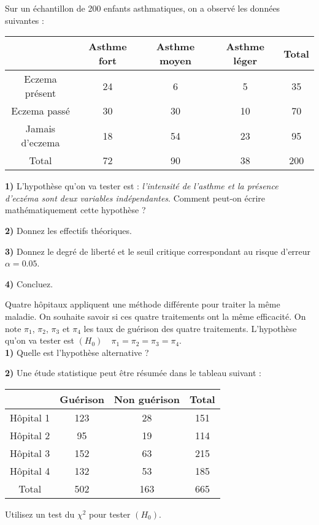 \documentclass{article}
\numberwithin{equation}{section}
\begin{document}
Sur un échantillon de 200 enfants asthmatiques, on a observé les données suivantes :\\
\begin{center}
\begin{tabular}{|c|c|c|c|c|}
\hline
                         & Asthme fort & Asthme moyen & Asthme léger & Total \\
\hline
Eczema présent &  24  & 6  & 5  &  35 \\
\hline
Eczema passé & 30  &  30  &  10  &  70 \\
\hline
Jamais d'eczema & 18 & 54 & 23 & 95 \\
\hline
Total & 72 & 90 & 38 & 200\\
\hline
\end{tabular}
\end{center}

{\bf 1)} L'hypothèse qu'on va tester est :  {\it l'intensité de l'asthme et la présence d'eczéma sont deux variables indépendantes}.
Comment peut-on écrire mathématiquement cette hypothèse ?

{\bf 2)} Donnez les effectifs théoriques.

{\bf 3)} Donnez le degré de liberté et le seuil critique correspondant au risque d'erreur $\alpha=0.05$.

{\bf 4)} Concluez.\\

\bigskip



Quatre hôpitaux appliquent une méthode différente pour traiter la même maladie. 
On souhaite savoir si ces quatre traitements ont la même efficacité. On note $\pi_1$, $\pi_2$, $\pi_3$ et $\pi_4$
les taux de guérison des quatre traitements. L'hypothèse qu'on va tester est 
$(H_0)\quad \pi_1=\pi_2=\pi_3=\pi_4$.\\  

{\bf 1)} Quelle est l'hypothèse alternative ?

{\bf 2)}  Une étude statistique peut être résumée dans 
le tableau suivant :\\
\begin{center}
\begin{tabular}{|c|c|c|c|}
\hline
               & Guérison & Non guérison & Total \\
\hline
Hôpital 1 & 123 & 28 & 151 \\
\hline
Hôpital 2 & 95 & 19 & 114 \\
\hline
Hôpital 3 & 152 & 63 & 215 \\
\hline
Hôpital 4 & 132 & 53 & 185 \\
\hline
Total & 502 & 163 & 665\\
\hline
\end{tabular}
\end{center}
Utilisez un test du $\chi^2$ pour tester $(H_0)$. \\
\end{document}
